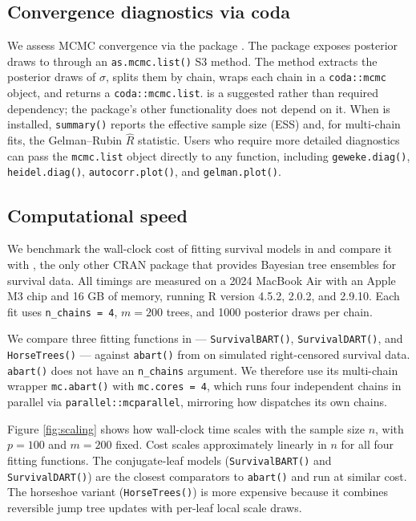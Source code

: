 \subsection{Convergence diagnostics via coda}\label{convergence-diagnostics-via-coda}

We assess MCMC convergence via the  package \citep{plummer2006coda}. The package exposes posterior draws to  through an \texttt{as.mcmc.list()} S3 method. The method extracts the posterior draws of \(\sigma\), splits them by chain, wraps each chain in a \texttt{coda::mcmc} object, and returns a \texttt{coda::mcmc.list}.  is a suggested rather than required dependency; the package's other functionality does not depend on it. When  is installed, \texttt{summary()} reports the effective sample size (ESS) and, for multi-chain fits, the Gelman--Rubin \(\hat{R}\) statistic. Users who require more detailed diagnostics can pass the \texttt{mcmc.list} object directly to any  function, including \texttt{geweke.diag()}, \texttt{heidel.diag()}, \texttt{autocorr.plot()}, and \texttt{gelman.plot()}.

\subsection{Computational speed}\label{computational-speed}

We benchmark the wall-clock cost of fitting survival models in  and compare it with , the only other CRAN package that provides Bayesian tree ensembles for survival data. All timings are measured on a 2024 MacBook Air with an Apple M3 chip and 16 GB of memory, running R version 4.5.2,  2.0.2, and  2.9.10. Each fit uses \texttt{n\_chains\ =\ 4}, \(m = 200\) trees, and 1000 posterior draws per chain.

We compare three fitting functions in  --- \texttt{SurvivalBART()}, \texttt{SurvivalDART()}, and \texttt{HorseTrees()} --- against \texttt{abart()} from  on simulated right-censored survival data. \texttt{abart()} does not have an \texttt{n\_chains} argument. We therefore use its multi-chain wrapper \texttt{mc.abart()} with \texttt{mc.cores\ =\ 4}, which runs four independent chains in parallel via \texttt{parallel::mcparallel}, mirroring how  dispatches its own chains.

Figure \ref{fig:scaling} shows how wall-clock time scales with the sample size \(n\), with \(p = 100\) and \(m = 200\) fixed. Cost scales approximately linearly in \(n\) for all four fitting functions. The conjugate-leaf models (\texttt{SurvivalBART()} and \texttt{SurvivalDART()}) are the closest comparators to \texttt{abart()} and run at similar cost. The horseshoe variant (\texttt{HorseTrees()}) is more expensive because it combines reversible jump tree updates with per-leaf local scale draws.

